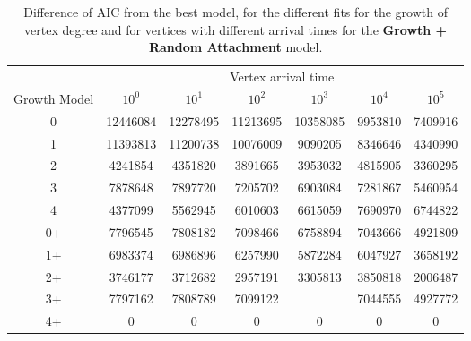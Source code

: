 \begin{table}[H]
\centering
\begin{tabular}{ccccccc}
                                  & \multicolumn{6}{c}{Vertex arrival time}                       \\
\multicolumn{1}{c|}{Growth Model} & $10^0$   & $10^1$   & $10^2$   & $10^3$   & $10^4$  & $10^5$  \\ \hline
\multicolumn{1}{c|}{0}            & 12446084 & 12278495 & 11213695 & 10358085 & 9953810 & 7409916 \\
\multicolumn{1}{c|}{1}            & 11393813 & 11200738 & 10076009 & 9090205  & 8346646 & 4340990 \\
\multicolumn{1}{c|}{2}            & 4241854  & 4351820  & 3891665  & 3953032  & 4815905 & 3360295 \\
\multicolumn{1}{c|}{3}            & 7878648  & 7897720  & 7205702  & 6903084  & 7281867 & 5460954 \\
\multicolumn{1}{c|}{4}            & 4377099  & 5562945  & 6010603  & 6615059  & 7690970 & 6744822 \\
\multicolumn{1}{c|}{0+}           & 7796545  & 7808182  & 7098466  & 6758894  & 7043666 & 4921809 \\
\multicolumn{1}{c|}{1+}           & 6983374  & 6986896  & 6257990  & 5872284  & 6047927 & 3658192 \\
\multicolumn{1}{c|}{2+}           & 3746177  & 3712682  & 2957191  & 3305813  & 3850818 & 2006487 \\
\multicolumn{1}{c|}{3+}           & 7797162  & 7808789  & 7099122  &          & 7044555 & 4927772 \\
\multicolumn{1}{c|}{4+}           & 0        & 0        & 0        & 0        & 0       & 0      
\end{tabular}
\caption{Difference of AIC from the best model, for the different fits for the growth of vertex degree and for vertices with different arrival times for the \textbf{Growth + Random Attachment} model.}
\label{tab:RA_evolution_diff}
\end{table}




